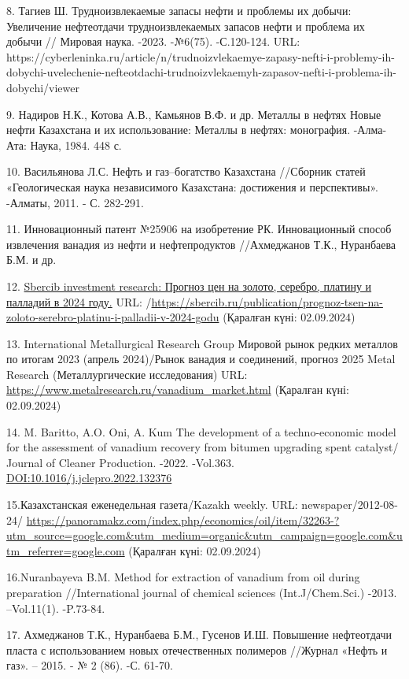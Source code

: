 \begin{references}
8. Тагиев Ш. Трудноизвлекаемые запасы нефти и проблемы их добычи:
Увеличение нефтеотдачи трудноизвлекаемых запасов нефти и проблема их
добычи // Мировая наука. -2023. -№6(75). -С.120-124. URL:
https://cyberleninka.ru/article/n/trudnoizvlekaemye-zapasy-nefti-i-problemy-ih-dobychi-uvelechenie-nefteotdachi-trudnoizvlekaemyh-zapasov-nefti-i-problema-ih-dobychi/viewer

9. Надиров Н.К., Котова А.В., Камьянов В.Ф. и др. Металлы в нефтях Новые
нефти Казахстана и их использование: Металлы в нефтях: монография.
-Алма-Ата: Наука, 1984. 448 с.

10. Васильянова Л.С. Нефть и газ--богатство Казахстана //Сборник статей
«Геологическая наука независимого Казахстана: достижения и перспективы».
-Алматы, 2011. - С. 282-291.

11. Инновационный патент №25906 на изобретение РК. Инновационный способ
извлечения ванадия из нефти и нефтепродуктов //Ахмеджанов Т.К.,
Нуранбаева Б.М. и др.

12.
\href{https://sbercib.ru/publications/sbercib-investment-research}{Sbercib
investment research: Прогноз цен на золото, серебро, платину и палладий
в 2024 году.} URL:
/\url{https://sbercib.ru/publication/prognoz-tsen-na-zoloto-serebro-platinu-i-palladii-v-2024-godu}
(Қаралған күні: 02.09.2024)

13. International Metallurgical Research Group Мировой рынок редких
металлов по итогам 2023 (апрель 2024)/Рынок ванадия и соединений,
прогноз 2025 Metal Research (Металлургические исследования) URL:
\url{https://www.metalresearch.ru/vanadium_market.html} (Қаралған күні:
02.09.2024)

14. M. Baritto, A.O. Oni, A. Kum The development of a techno-economic
model for the assessment of vanadium recovery from bitumen upgrading
spent catalyst/ Journal of Cleaner Production. -2022. -Vol.363.
\href{https://doi.org/10.1016/j.jclepro.2022.132376}{DOI:10.1016/j.jclepro.2022.132376}

15.Казахстанская еженедельная газета/Kazakh weekly. URL:
newspaper/2012-08-24/
\url{https://panoramakz.com/index.php/economics/oil/item/32263-?utm_source=google.com&utm_medium=organic&utm_campaign=google.com&utm_referrer=google.com}
(Қаралған күні: 02.09.2024)

16.Nuranbayeva B.M. Method for extraction of vanadium from oil during
preparation //International journal of chemical sciences
(Int.J/Chem.Sci.) -2013. --Vol.11(1). -P.73-84.

17. Ахмеджанов Т.К., Нуранбаева Б.М., Гусенов И.Ш. Повышение нефтеотдачи
пласта с использованием новых отечественных полимеров //Журнал «Нефть и
газ». -- 2015. - № 2 (86). -С. 61-70.


\end{references}
